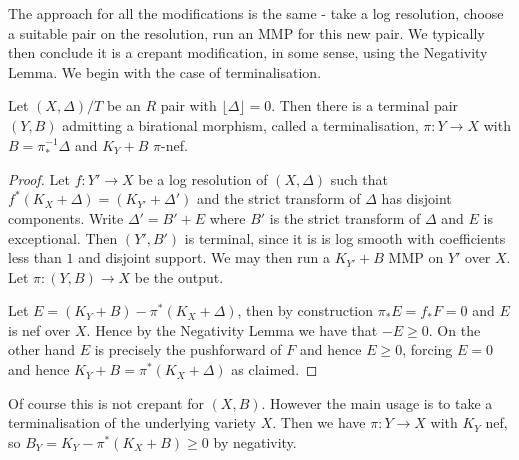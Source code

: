 The approach for all the modifications is the same - take a log resolution, choose a suitable pair on the resolution, run an MMP for this new pair. We typically then conclude it is a crepant modification, in some sense, using the Negativity Lemma. We begin with the case of terminalisation.


\begin{lemma}
	
	Let $(X,\Delta)/T$ be an $R$ pair with $\lfloor \Delta \rfloor =0$. Then there is a terminal pair $(Y,B)$ admitting a birational morphism, called a terminalisation, $\pi:Y \to X$ with $B=\pi_{*}^{-1}\Delta$ and $K_{Y}+B$ $\pi$-nef.
	
	\end{lemma}



\begin{proof}
	
	Let $f:Y' \to X$ be a log resolution of $(X,\Delta)$ such that $f^{*}(K_{X}+\Delta)=(K_{Y'}+\Delta')$ and the strict transform of $\Delta$ has disjoint components. Write $\Delta'=B'+E$ where $B'$ is the strict transform of $\Delta$ and $E$ is exceptional. Then $(Y',B')$ is terminal, since it is is log smooth with coefficients less than $1$ and disjoint support. We may then run a $K_{Y'}+B$ MMP on $Y'$ over $X$. Let $\pi:(Y,B) \to X$ be the output. 
	
	Let $E=(K_{Y}+B)-\pi^{*}(K_{X}+\Delta)$, then by construction $\pi_{*}E=f_{*}F=0$ and $E$ is nef over $X$. Hence by the Negativity Lemma we have that $-E \geq 0$. On the other hand $E$ is precisely the pushforward of $F$ and hence $E \geq 0$, forcing $E=0$ and hence $K_{Y}+B=\pi^{*}(K_{X}+\Delta)$ as claimed.

\end{proof}

%	
%	

\begin{remark}
	Of course this is not crepant for $(X,B)$. However the main usage is to take a terminalisation of the underlying variety $X$. Then we have $\pi \colon Y \to X$ with $K_{Y}$ nef, so $B_{Y}=K_{Y}-\pi^{*}(K_{X}+B) \geq 0$ by negativity. 
	
\end{remark}


